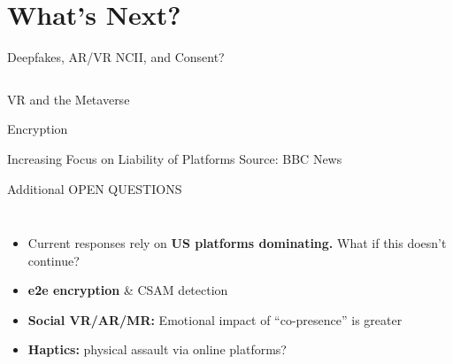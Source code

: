\documentclass[nobackground,dvipsnames,table,aspectratio=169]{beamer}
\begin{document}
\section{What's Next?}

\begin{frame}{Deepfakes, AR/VR NCII, and Consent?}
    \begin{columns}
    \end{columns}
\end{frame}

\begin{frame}{VR and the Metaverse}
\end{frame}

\begin{frame}{Encryption}
\end{frame}

\begin{frame}{Increasing Focus on Liability of Platforms}
    Source: BBC News
\end{frame}

\begin{frame}{Additional OPEN QUESTIONS}
    \begin{columns}
            \begin{itemize}
                \item Current responses rely on \textbf{US platforms dominating.} What if this doesn’t continue?
                \item \textbf{e2e encryption} & CSAM detection 
                \item \textbf{Social VR/AR/MR:} Emotional impact of “co-presence” is greater
                \item \textbf{Haptics:} physical assault via online platforms?
            \end{itemize}
    \end{columns}
\end{frame}
\end{document}
